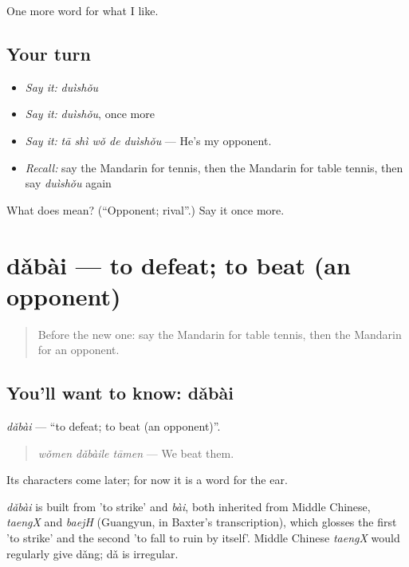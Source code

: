 \begin{grammarlens}[title={What you've built}]
One more word for what I like.
\end{grammarlens}

\subsection*{Your turn}
\begin{itemize}
\raggedright
  \item \emph{Say it:} \emph{duìshǒu}
  \item \emph{Say it:} \emph{duìshǒu}, once more
  \item \emph{Say it:} \emph{tā shì wǒ de duìshǒu} — He's my opponent.
  \item \emph{Recall:} say the Mandarin for tennis, then the Mandarin for table tennis, then say \emph{duìshǒu} again
\end{itemize}

\begin{tcolorbox}[breakable,colback=teal!4,colframe=teal!35!black,title={Before you move on}]
What does  mean? (\textquotedblleft{}Opponent; rival\textquotedblright{}.) Say it once more.
\end{tcolorbox}
\section[dǎbài]{dǎbài — to defeat; to beat (an opponent)}

\label{lesson:ZH-C262-dabai}



\begin{quote}
Before the new one: say the Mandarin for table tennis, then the Mandarin for an opponent.
\end{quote}

\subsection*{You'll want to know: dǎbài}
\emph{dǎbài} — \textquotedblleft{}to defeat; to beat (an opponent)\textquotedblright{}.

\begin{quote}
\emph{wǒmen dǎbàile tāmen} — We beat them.
\end{quote}

Its characters come later; for now it is a word for the ear.

\begin{cousinweb}
\emph{dǎbài} is built from  'to strike' and \emph{bài}, both inherited from Middle Chinese, \emph{taengX} and \emph{baejH} (Guangyun, in Baxter's transcription), which glosses the first 'to strike' and the second 'to fall to ruin by itself'. Middle Chinese \emph{taengX} would regularly give dǎng; dǎ is irregular.
\end{cousinweb}

